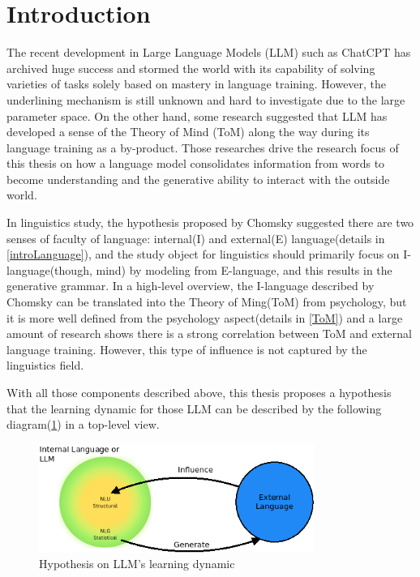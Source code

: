 \documentclass[12pt]{article}
\begin{document}


\newpage
\tableofcontents



\newpage
\section{Introduction}

The recent development in Large Language Models (LLM) such as ChatCPT has archived huge success and stormed the world  with its capability of solving varieties of tasks solely based on mastery in language training\cite{Bubeck_2023}. However, the underlining mechanism is still unknown and hard to investigate due to the large parameter space. On the other hand, some research\cite{Kosinski_2023} suggested that LLM has developed a sense of the Theory of Mind (ToM) along the way during its language training as a by-product. Those researches drive the research focus of this thesis on how a language model consolidates information from words to become understanding and the generative ability to interact with the outside world.

In linguistics study, the hypothesis proposed by Chomsky\cite{Hauser_2002} suggested there are two senses of faculty of language: internal(I) and external(E) language(details in \ref{introLanguage}), and the study object for linguistics should primarily focus on I-language(though, mind) by modeling from E-language, and this results in the generative grammar. In a high-level overview, the I-language described by Chomsky can be translated into the Theory of Ming(ToM) from psychology, but it is more well defined from the psychology aspect(details in \ref{ToM}) and a large amount of research shows there is a strong correlation between ToM and external language training. However, this type of influence is not captured by the linguistics field.

With all those components described above, this thesis proposes a hypothesis that the learning dynamic for those LLM can be described by the following diagram(\ref{fig:LLMhypothesis}) in a top-level view.
\begin{figure} [!h]
\begin{center}
\includegraphics[width=0.8\textwidth]{figures/Ilang_Elang_NLU_NLG.png}
\caption{Hypothesis on LLM's learning dynamic} 
\label{fig:LLMhypothesis}
\end{center}
\end{figure}
\end{document}
